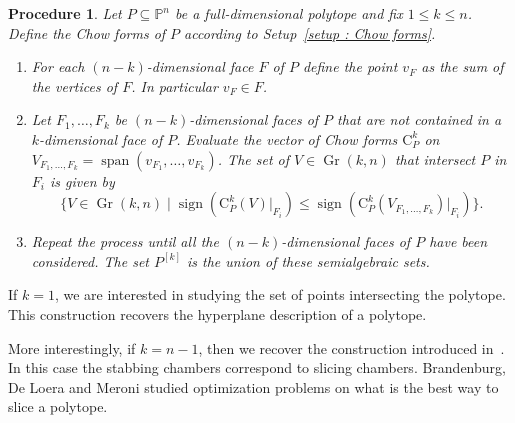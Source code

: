 \documentclass[english]{ourlematema}
\newtheorem{procedure}[thm]{Procedure}
\DeclareMathOperator{\Gr}{Gr}
\DeclareMathOperator{\spanv}{span}
\DeclareMathOperator{\sign}{sign}
\newcommand{\PP}{\mathbb{P}}
\newcommand{\Pk}{P^{[k]}}
\newcommand{\CPk}{\mathrm{C}_P^k}
\begin{document}
\begin{procedure}
    Let $P\subseteq \PP^n$ be a full-dimensional polytope and fix $1\leq k \leq n$. Define the Chow forms of $P$ according to Setup~\ref{setup : Chow forms}.
    \begin{enumerate}
        \item For each $(n-k)$-dimensional face $F$ of $P$ define the point $v_F$ as the sum of the vertices of $F$. In particular $v_F\in F$.
        \item Let $F_1,\ldots, F_k$ be $(n-k)$-dimensional faces of $P$ that are not contained in a $k$-dimensional face of $P$. Evaluate the vector of Chow forms $\CPk$ on $V_{F_1,\ldots,F_k}=\spanv(v_{F_1},\ldots, v_{F_k})$.
        The set of $V\in \Gr(k,n)$ that intersect $P$ in $F_i$ is given by 
        \[ \{ V\in \Gr(k,n) \mid \sign(\CPk(V)|_{F_i}) \leq \sign(\CPk(V_{F_1,\ldots,F_k})|_{F_i}) \}. \]
        \item Repeat the process until all the $(n-k)$-dimensional faces of $P$ have been considered. The set $\Pk$ is the union of these semialgebraic sets.
    \end{enumerate}
\end{procedure}

\begin{rem}
    If $k=1$, we are interested in studying the set of points intersecting the polytope. This construction recovers the hyperplane description of a polytope. 

    More interestingly, if $k=n-1$, then we recover the construction introduced in~\cite{BestPolytopeSlice}. In this case the stabbing chambers correspond to slicing chambers. Brandenburg, De Loera and Meroni studied optimization problems on what is the best way to slice a polytope.
\end{rem}
\end{document}
